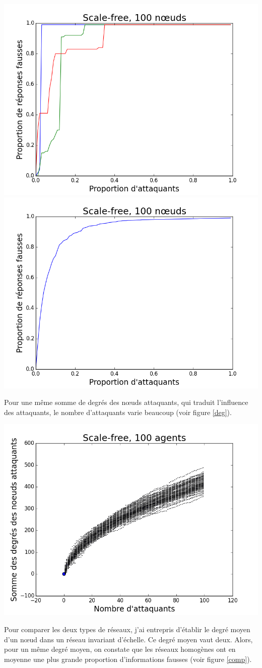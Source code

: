 \documentclass[12pt,a4paper]{article}
\begin{document}
\begin{center}
\includegraphics[width=0.49\linewidth]{../resultats/scale-free/sf-t1s-n100-2-it3.png}
\includegraphics[width=0.49\linewidth]{../resultats/scale-free/sf-t1-n100-1-it100.png}
 \label{sf}
\end{center}

Pour une même somme de degrés des nœuds attaquants, qui traduit l'influence des attaquants, le nombre d'attaquants varie beaucoup (voir figure \ref{deg}).


\begin{center}
\includegraphics[width=0.49\linewidth]{../resultats/scale-free/sf-t2-n-100-1-it100.png}
 \label{deg}
\end{center}

Pour comparer les deux types de réseaux, j'ai entrepris d'établir le degré moyen d'un nœud dans un réseau invariant d'échelle.
Ce degré moyen vaut deux.
Alors, pour un même degré moyen, on constate que les réseaux homogènes ont en moyenne une plus grande proportion d'informations fausses (voir figure \ref{comp}).
\end{document}
